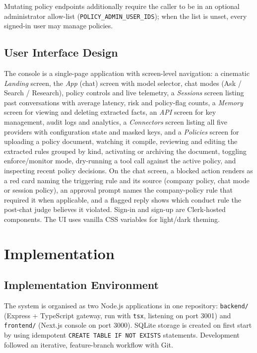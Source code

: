 \documentclass[12pt,a4paper,oneside]{report}
\begin{document}
Mutating policy endpoints additionally require the caller to be in an
optional administrator allow-list (\texttt{POLICY\_ADMIN\_USER\_IDS});
when the list is unset, every signed-in user may manage policies.

\section{User Interface Design}
The console is a single-page application with screen-level navigation:
a cinematic \emph{Landing} screen, the \emph{App} (chat) screen with
model selector, chat modes (Ask / Search / Research), policy controls
and live telemetry, a \emph{Sessions} screen listing past
conversations with average latency, risk and policy-flag counts, a
\emph{Memory} screen for viewing and deleting extracted facts, an
\emph{API} screen for key management, audit logs and analytics, a
\emph{Connectors} screen listing all five providers with configuration
state and masked keys, and a \emph{Policies} screen for uploading a
policy document, watching it compile, reviewing and editing the
extracted rules grouped by kind, activating or archiving the document,
toggling enforce/monitor mode, dry-running a tool call against the
active policy, and inspecting recent policy decisions. On the chat
screen, a blocked action renders as a red card naming the triggering
rule and its source (company policy, chat mode or session policy), an
approval prompt names the company-policy rule that required it when
applicable, and a flagged reply shows which conduct rule the post-chat
judge believes it violated. Sign-in and sign-up are Clerk-hosted
components. The UI uses vanilla CSS variables for light/dark theming.

\chapter{Implementation}

\section{Implementation Environment}
The system is organised as two Node.js applications in one repository:
\texttt{backend/} (Express + TypeScript gateway, run with
\texttt{tsx}, listening on port 3001) and \texttt{frontend/} (Next.js
console on port 3000). SQLite storage is created on first start by
 using idempotent \texttt{CREATE TABLE
IF NOT EXISTS} statements. Development followed an iterative,
feature-branch workflow with Git.
\end{document}
